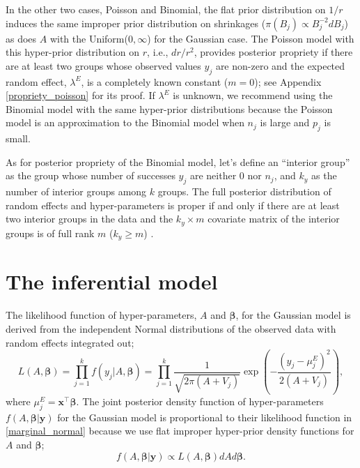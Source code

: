 \documentclass[article]{jss}
\begin{document}
In the other two cases, Poisson and Binomial, the flat prior distribution on $1/r$ induces the same improper prior distribution on shrinkages ($\pi(B_{j})\propto B_{j}^{-2} d B_j$) as does $A$ with the Uniform($0, \infty$) for the Gaussian case. The Poisson model with this hyper-prior distribution on $r$, i.e., $dr/r^2$,  provides posterior propriety if there are at least two groups whose observed values $y_j$ are non-zero  and the expected random effect, $\lambda^E$, is a completely known constant ($m=0$); see Appendix \ref{propriety_poisson} for its proof. If $\lambda^E$ is unknown,  we recommend using the Binomial model with the same hyper-prior distributions because the Poisson model is  an approximation to the Binomial model when $n_j$ is large and $p_j$ is small.

As for posterior propriety of the Binomial model, let's define an ``interior group'' as the group whose number of successes $y_j$ are neither 0 nor $n_j$, and $k_y$ as the number of interior groups among $k$ groups. The full posterior distribution of random effects and hyper-parameters is proper if and only if there are at least two interior groups in the data and the $k_y\times m$ covariate matrix of the interior groups is of full rank $m$ ($k_y\ge m$) \citep{tak2016propriety}. 



\section[Inference]{The inferential model}\label{inference}

The likelihood function of hyper-parameters, $A$ and $\boldsymbol{\beta}$, for the Gaussian  model is derived from the independent Normal distributions of the observed data with random effects integrated out; %
\begin{equation}\label{marginal_normal}
L(A, \boldsymbol{\boldsymbol{\beta}})=\prod_{j=1}^k f(y_j\vert A, \boldsymbol{\boldsymbol{\beta}})=\prod_{j=1}^k \frac{1}{\sqrt{2\pi (A+V_j)}}\exp\left(-\frac{(y_j-\mu^E_j)^2}{2(A+V_j)}\right),
\end{equation}
where $\mu^E_j=\boldsymbol{x}^\top\boldsymbol{\beta}$. The joint posterior density  function of hyper-parameters $f(A, \boldsymbol{\boldsymbol{\beta}}\vert \boldsymbol{y})$ for the Gaussian  model is proportional to their likelihood function in  \eqref{marginal_normal} because we use flat improper hyper-prior density functions for $A$ and $\boldsymbol{\beta}$;
\begin{equation}\label{marginal_post_normal}
f(A, \boldsymbol{\boldsymbol{\beta}}\vert \boldsymbol{y})\propto L(A, \boldsymbol{\boldsymbol{\beta}})dAd\boldsymbol{\beta}.
\end{equation}
\end{document}
